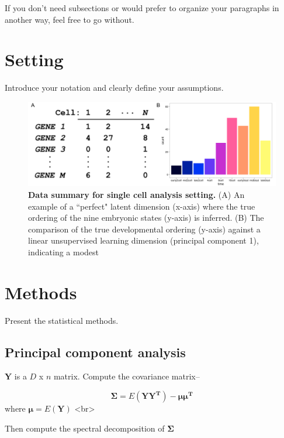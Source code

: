 \documentclass[english, 11pt]{article}\usepackage[]{graphicx}\usepackage[]{color}
\begin{document}
If you don't need subsections or would prefer to organize your paragraphs
in another way, feel free to go without.




\section{Setting}

Introduce your notation and clearly define your assumptions. 

\begin{figure}[H]
\begin{center}
\includegraphics[scale=0.3]{images/Figure2.png}
\end{center}
\caption{\textbf{Data summary for single cell analysis setting.} (A) An example of a ``perfect" latent dimension (x-axis) where the true ordering of the nine embryonic states (y-axis) is inferred. (B) The comparison of the true developmental ordering (y-axis) against a linear unsupervised learning dimension (principal component 1), indicating a modest}
\end{figure}





\section{Methods}

Present the statistical methods.

\subsection{Principal component analysis}
$\mathbf{Y}$ is a $D$ x $n$ matrix. Compute the covariance matrix--

$$ \mathbf{\Sigma} = E(\mathbf{YY^{T}}) - \mathbf{\mu \mu^T}$$
where $\mathbf{\mu} = E(\mathbf{Y})$ <br>

Then compute the spectral decomposition of $\mathbf{\Sigma}$
\end{document}
